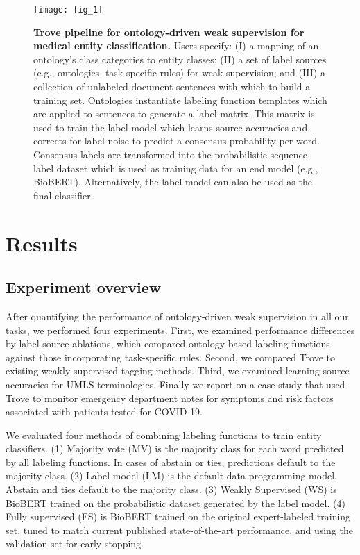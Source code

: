 \documentclass{article}
\begin{document}
\begin{figure}[ht]
\centering
\texttt{[image: fig\_1]}
\caption{\label{fig:trove}
\textbf{Trove pipeline for ontology-driven weak supervision for medical entity classification.}
Users specify: (I) a mapping of an ontology's class categories to entity classes; (II) a set of label sources (e.g., ontologies, task-specific rules) for weak supervision; and (III) a collection of unlabeled document sentences with which to build a training set. 
Ontologies instantiate labeling function templates which are applied to sentences to generate a label matrix.
This matrix is used to train the label model which learns source accuracies and corrects for label noise to predict a consensus probability per word.
Consensus labels are transformed into the probabilistic sequence label dataset  which is used as training data for an end model (e.g., BioBERT). Alternatively, the label model can also be used as the final classifier.}
\end{figure}


\section*{Results}

\subsection*{Experiment overview}
After quantifying the performance of ontology-driven weak supervision in all our tasks, we performed four experiments. 
First, we examined performance differences by label source ablations, which compared ontology-based labeling functions against those incorporating task-specific rules. 
Second, we compared Trove to existing weakly supervised tagging methods. 
Third, we examined learning source accuracies for UMLS terminologies. 
Finally we report on a case study that used Trove to monitor emergency department notes for symptoms and risk factors associated with patients tested for COVID-19. 

We evaluated four methods of combining labeling functions to train entity classifiers.
{
(1) Majority vote (MV) is the majority class for each word predicted by all labeling functions. In cases of abstain or ties, predictions default to the majority class. 
(2) Label model (LM) is the default data programming model. Abstain and ties default to the majority class.
(3) Weakly Supervised (WS) is BioBERT trained on the probabilistic dataset generated by the label model.
(4) Fully supervised (FS) is BioBERT trained on the original expert-labeled training set, tuned to match current published state-of-the-art performance, and using the validation set for early stopping.}
\end{document}
